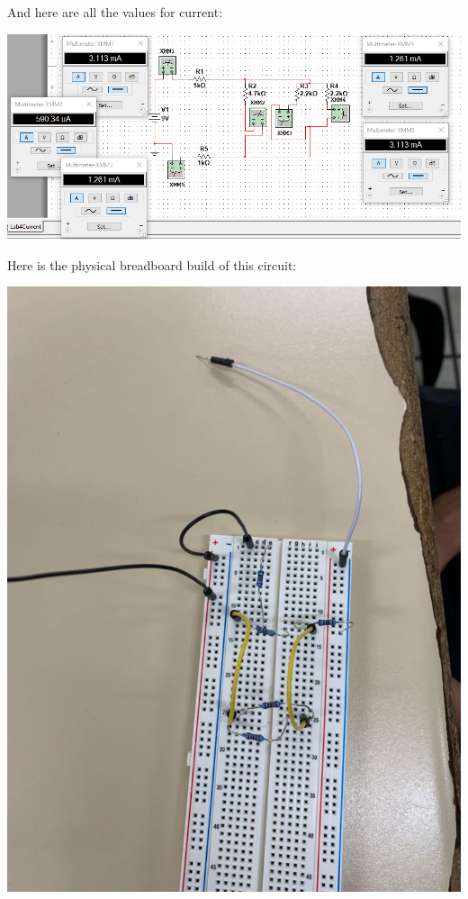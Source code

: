 \documentclass{article}
\begin{document}
And here are all the values for current:

\includegraphics[width=\textwidth]{Lab4Current.png}

\pagebreak

Here is the physical breadboard build of this circuit:

\includegraphics[width=\textwidth]{Breadboard.jpg}
\end{document}
